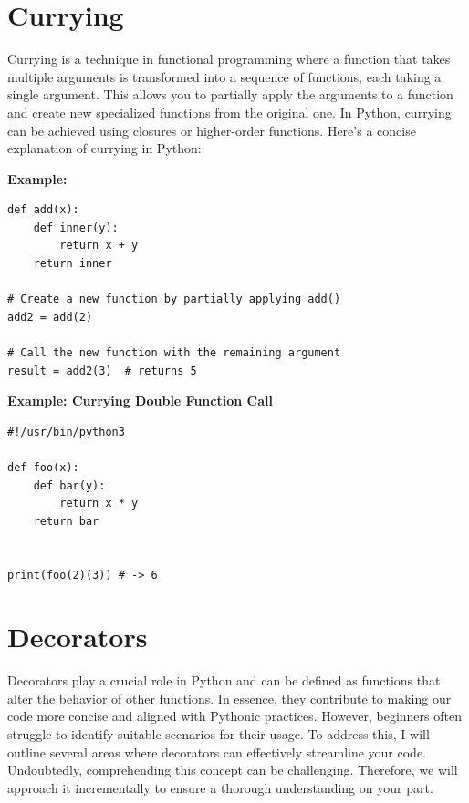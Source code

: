 \documentclass{report}
\begin{document}
    \section{Currying}
    Currying is a technique in functional programming where a function that takes multiple arguments is transformed into a sequence of functions, each taking a single argument. This allows you to partially apply the arguments to a function and create new specialized functions from the original one.
    \bigbreak \noindent 
    In Python, currying can be achieved using closures or higher-order functions. Here's a concise explanation of currying in Python:
    \bigbreak \noindent 
    \begin{mdframed}
        \textbf{Example:}
        \begin{verbatim}
def add(x):
    def inner(y):
        return x + y
    return inner

# Create a new function by partially applying add()
add2 = add(2)

# Call the new function with the remaining argument
result = add2(3)  # returns 5
        \end{verbatim}
    \end{mdframed}
    \bigbreak \noindent 
    \begin{mdframed}
      \textbf{Example: Currying Double Function Call}
      \begin{verbatim}
#!/usr/bin/python3

def foo(x):
    def bar(y):
        return x * y
    return bar


print(foo(2)(3)) # -> 6
      \end{verbatim}
      \bigbreak \noindent 
      \bigbreak \noindent 
    \end{mdframed}



    \pagebreak \bigbreak \noindent \section{Decorators}
    Decorators play a crucial role in Python and can be defined as functions that alter the behavior of other functions. In essence, they contribute to making our code more concise and aligned with Pythonic practices. However, beginners often struggle to identify suitable scenarios for their usage. To address this, I will outline several areas where decorators can effectively streamline your code.
    \bigbreak \noindent 
    Undoubtedly, comprehending this concept can be challenging. Therefore, we will approach it incrementally to ensure a thorough understanding on your part.
    \bigbreak \noindent
\end{document}
